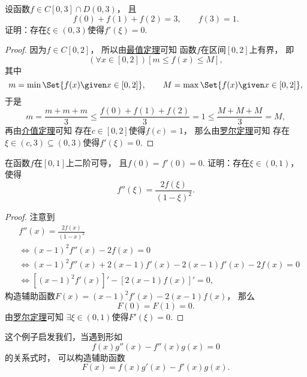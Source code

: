 \begin{example}
设函数\(f \in C[0,3] \cap D(0,3)\)，
且\[
	f(0) + f(1) + f(2) = 3,
	\qquad
	f(3) = 1.
\]
证明：存在\(\xi\in(0,3)\)使得\(f'(\xi) = 0\).
\begin{proof}
因为\(f \in C[0,2]\)，
所以由\hyperref[theorem:极限.最值定理]{最值定理}可知
函数\(f\)在区间\([0,2]\)上有界，
即\[
	(\forall x\in[0,2])
	[m \leq f(x) \leq M],
\]
其中\[
	m = \min\Set{ f(x) \given x\in[0,2] },
	\qquad
	M = \max\Set{ f(x) \given x\in[0,2] },
\]
于是\[
	m = \frac{m+m+m}3 \leq \frac{f(0) + f(1) + f(2)}3 = 1 \leq \frac{M+M+M}3 = M,
\]
再由\hyperref[theorem:极限.闭区间上连续函数的性质.介值定理2]{介值定理}可知
存在\(c\in[0,2]\)使得\(f(c) = 1\)，
那么由\hyperref[theorem:微分中值定理.罗尔定理]{罗尔定理}可知
存在\(\xi\in(c,3)\subseteq(0,3)\)使得\(f'(\xi) = 0\).
\end{proof}
\end{example}

\begin{example}
在函数\(f\)在\([0,1]\)上二阶可导，
且\(f(0) = f'(0) = 0\).
证明：存在\(\xi\in(0,1)\)，
使得\[
	f''(\xi) = \frac{2 f(\xi)}{(1-\xi)^2}.
\]
\begin{proof}
注意到\begin{align*}
	&f''(x) = \frac{2 f(x)}{(1-x)^2} \\
	&\iff
	(x-1)^2 f''(x) - 2 f(x) = 0 \\
	&\iff
	(x-1)^2 f''(x) + 2 (x-1) f'(x) - 2 (x-1) f'(x) - 2 f(x) = 0 \\
	&\iff
	[(x-1)^2 f'(x)]' - [2 (x-1) f(x)]' = 0,
\end{align*}
构造辅助函数\(F(x) = (x-1)^2 f'(x) - 2 (x-1) f(x)\)，
那么\[
	F(0) = F(1) = 0.
\]
由\hyperref[theorem:微分中值定理.罗尔定理]{罗尔定理}可知
\(\exists\xi\in(0,1)\)使得\(F'(\xi) = 0\).
\end{proof}
\end{example}
\begin{remark}
这个例子启发我们，当遇到形如\[
	f(x) g''(x) - f''(x) g(x) = 0
\]的关系式时，
可以构造辅助函数\[
	F(x) = f(x) g'(x) - f'(x) g(x).
\]
\end{remark}

